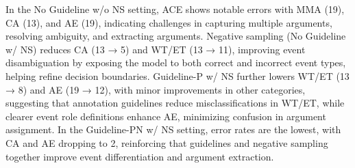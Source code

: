 In the No Guideline w/o NS setting, ACE shows notable errors with MMA (19), CA (13), and AE (19), indicating challenges in capturing multiple arguments, resolving ambiguity, and extracting arguments. Negative sampling (No Guideline w/ NS) reduces CA (13 → 5) and WT/ET (13 → 11), improving event disambiguation by exposing the model to both correct and incorrect event types, helping refine decision boundaries. Guideline-P w/ NS further lowers WT/ET (13 → 8) and AE (19 → 12), with minor improvements in other categories, suggesting that annotation guidelines reduce misclassifications in WT/ET, while clearer event role definitions enhance AE, minimizing confusion in argument assignment. In the Guideline-PN w/ NS setting, error rates are the lowest, with CA and AE dropping to 2, reinforcing that guidelines and negative sampling together improve event differentiation and argument extraction.



